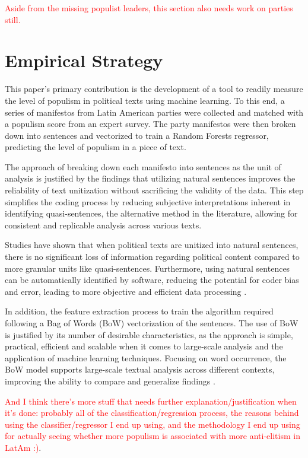 \documentclass[12pt,letterpaper]{article}
\begin{document}
\noindent \textcolor{red}{Aside from the missing populist leaders, this section also needs work on parties still.}

\section*{Empirical Strategy} 

\vspace{.25cm}

\noindent This paper's primary contribution is the development of a tool to readily measure the level of populism in political texts using machine learning. To this end, a series of manifestos from Latin American parties were collected and matched with a populism score from an expert survey. The party manifestos were then broken down into sentences and vectorized to train a Random Forests regressor, predicting the level of populism in a piece of text.

The approach of breaking down each manifesto into sentences as the unit of analysis is justified by the findings that utilizing natural sentences improves the reliability of text unitization without sacrificing the validity of the data. This step simplifies the coding process by reducing subjective interpretations inherent in identifying quasi-sentences, the alternative method in the literature, allowing for consistent and replicable analysis across various texts. 

Studies have shown that when political texts are unitized into natural sentences, there is no significant loss of information regarding political content compared to more granular units like quasi-sentences. Furthermore, using natural sentences can be automatically identified by software, reducing the potential for coder bias and error, leading to more objective and efficient data processing \autocite{daublerNaturalSentencesValid2012}. 

In addition, the feature extraction process to train the algorithm required following a Bag of Words (BoW) vectorization of the sentences. The use of BoW is justified by its number of desirable characteristics, as the approach is simple, practical, efficient and scalable when it comes to large-scale analysis and the application of machine learning techniques. Focusing on word occurrence, the BoW model supports large-scale textual analysis across different contexts, improving the ability to compare and generalize findings \autocite{grimmerTextDataPromise2013}.

\textcolor{red}{And I think there's more stuff that needs further explanation/justification when it's done: probably all of the classification/regression process, the reasons behind using the classifier/regressor I end up using, and the methodology I end up using for actually seeing whether more populism is associated with more anti-elitism in LatAm :)}. 
\end{document}
